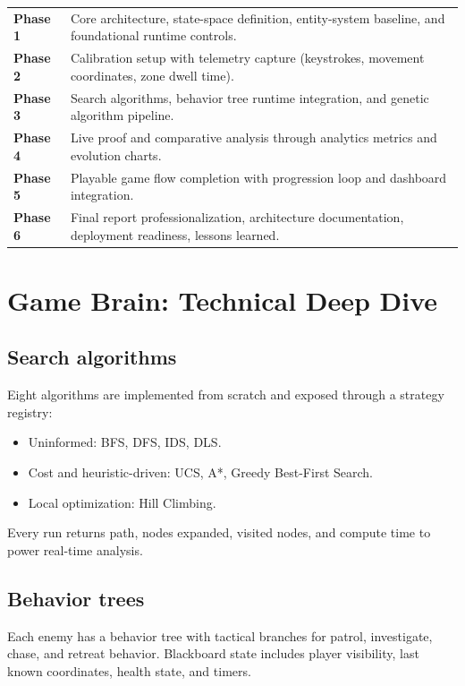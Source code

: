 \documentclass[11pt,a4paper,twoside]{article}
\begin{document}
\begin{center}
\begin{tabular}{>{\bfseries}p{2.2cm} p{10.3cm}}
\toprule
Phase 1 & Core architecture, state-space definition, entity-system baseline, and foundational runtime controls. \\
Phase 2 & Calibration setup with telemetry capture (keystrokes, movement coordinates, zone dwell time). \\
Phase 3 & Search algorithms, behavior tree runtime integration, and genetic algorithm pipeline. \\
Phase 4 & Live proof and comparative analysis through analytics metrics and evolution charts. \\
Phase 5 & Playable game flow completion with progression loop and dashboard integration. \\
Phase 6 & Final report professionalization, architecture documentation, deployment readiness, lessons learned. \\
\bottomrule
\end{tabular}
\end{center}

\section{Game Brain: Technical Deep Dive}
\label{sec:brain}

\subsection{Search algorithms}
Eight algorithms are implemented from scratch and exposed through a strategy registry:
\begin{itemize}[leftmargin=6mm]
  \item Uninformed: BFS, DFS, IDS, DLS.
  \item Cost and heuristic-driven: UCS, A*, Greedy Best-First Search.
  \item Local optimization: Hill Climbing.
\end{itemize}

Every run returns path, nodes expanded, visited nodes, and compute time to power real-time analysis.

\subsection{Behavior trees}
Each enemy has a behavior tree with tactical branches for patrol, investigate, chase, and retreat behavior.
Blackboard state includes player visibility, last known coordinates, health state, and timers.
\end{document}
